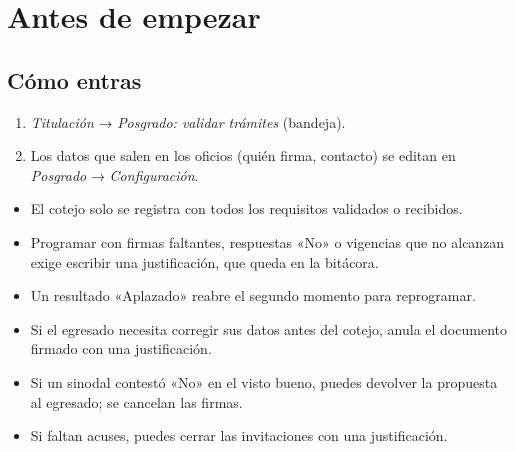 \section{Antes de empezar}
\subsection*{Cómo entras}
\begin{enumerate}
  \item \emph{Titulación} → \emph{Posgrado: validar trámites} (bandeja).
  \item Los datos que salen en los oficios (quién firma, contacto) se editan en \emph{Posgrado} → \emph{Configuración}.
\end{enumerate}
\begin{tencuenta}
\begin{itemize}
  \item El cotejo solo se registra con todos los requisitos validados o recibidos.
  \item Programar con firmas faltantes, respuestas «No» o vigencias que no alcanzan exige escribir una justificación, que queda en la bitácora.
  \item Un resultado «Aplazado» reabre el segundo momento para reprogramar.
\end{itemize}
\end{tencuenta}
\begin{algosalemal}
\begin{itemize}
  \item Si el egresado necesita corregir sus datos antes del cotejo, anula el documento firmado con una justificación.
  \item Si un sinodal contestó «No» en el visto bueno, puedes devolver la propuesta al egresado; se cancelan las firmas.
  \item Si faltan acuses, puedes cerrar las invitaciones con una justificación.
\end{itemize}
\end{algosalemal}
